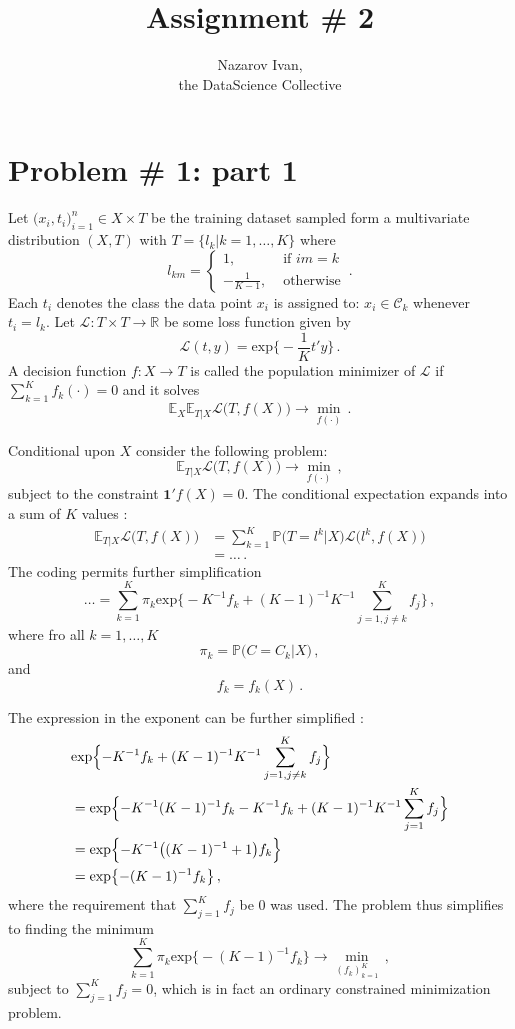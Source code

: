 \documentclass[a4paper]{article}
\title{Assignment \# 2}
\author{Nazarov Ivan, \rus{101мНОД(ИССА)}\\the DataScience Collective}
\newcommand{\Real}{\mathbb{R}}
\newcommand{\pr}{\mathbb{P}}
\newcommand{\ex}{\mathbb{E}}
\newcommand{\Lcal}{\mathcal{L}}
\newcommand{\one}{\mathbf{1}}
\begin{document}
\maketitle

\tableofcontents
\clearpage

\section{Problem \# 1: part 1} %
\label{sec:problem_1}

Let $\bigl(x_i, t_i\bigr)_{i=1}^n\in X\times T$ be the training dataset
sampled form a multivariate distribution $(X,T)$ with $T = \{ l_k | k=1,\ldots,K\}$
where
\[
l_{km} = \begin{cases}
	1, &\text{ if } im = k\\
	- \frac{1}{K-1}, &\text{ otherwise}
\end{cases}  \,.
\]
Each $t_i$ denotes the class the data point $x_i$ is assigned to: $x_i\in \mathcal{C}_k$
whenever $t_i = l_k$. Let $\mathcal{L}: T\times T \to \Real$ be some loss function
given by
\[ \mathcal{L}(t,y) = \text{exp}\bigl\{ -\frac{1}{K} t'y \bigr\} \,. \]
A decision function $f:X\to T$ is called the population minimizer of $\mathcal{L}$ if
$\sum_{k=1}^K f_k(\cdot) = 0$ and it solves
\[ \ex_X \ex_{T|X}\mathcal{L}\bigl(T, f(X)\bigr) \to \min_{f(\cdot)} \,. \]

Conditional upon $X$ consider the following problem:
\[ \ex_{T|X} \Lcal\bigl( T, f(X) \bigr) \to \min_{f(\cdot)}\,, \]
subject to the constraint $\one'f(X) = 0$. The conditional expectation expands into
a sum of $K$ values :
\begin{align*}
	\ex_{T|X} \Lcal\bigl( T, f(X) \bigr)
	&= \sum_{k=1}^K \pr\bigl( T = l^k \big\vert X \bigr) \Lcal\bigl( l^k, f(X) \bigr)\\
	& = \ldots\,.
\end{align*}
The coding permits further simplification
\[
\ldots = \sum_{k=1}^K \pi_k \text{exp}\bigl\{ - K^{-1} f_k + (K-1)^{-1}K^{-1} \sum_{j=1,j\neq k}^K f_j \bigr\} \,,
\]
where fro all $k=1,\ldots, K$
\[ \pi_k = \pr\bigl( C = C_k \big\vert X \bigr) \,, \]
and
\[ f_k = f_k( X )\,. \]

The expression in the exponent can be further simplified :
\begin{align*}
	&  \text{exp}\Bigl\{ - K^{-1} f_k + (K-1)^{-1}K^{-1} \sum_{j=1,j\neq k}^K f_j \Bigr\}\\
	&= \text{exp}\Bigl\{ - K^{-1} (K-1)^{-1} f_k - K^{-1} f_k + (K-1)^{-1}K^{-1} \sum_{j=1}^K f_j \Bigr\}\\
	&= \text{exp}\Bigl\{ - K^{-1}\bigl( (K-1)^{-1} + 1 \bigr) f_k \Bigr\}\\
	&= \text{exp}\bigl\{ - (K-1)^{-1} f_k \bigr\}\,,
\end{align*}
where the requirement that $\sum_{j=1}^K f_j$ be $0$ was used. The problem thus
simplifies to finding the minimum
\[ \sum_{k=1}^K \pi_k \text{exp}\bigl\{ -(K-1)^{-1} f_k \bigr\} \to \min_{(f_k)_{k=1}^K} \,, \]
subject to $\sum_{j=1}^K f_j = 0$, which is in fact an ordinary constrained minimization
problem.
\end{document}
